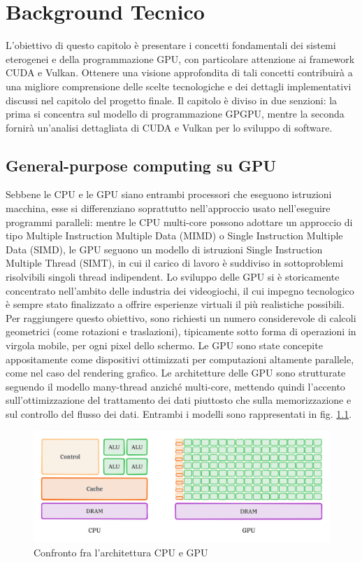 \chapter{Background Tecnico}
\label{sec:background}


L'obiettivo di questo capitolo è presentare i concetti fondamentali dei sistemi eterogenei e della programmazione GPU, con particolare attenzione ai framework CUDA e Vulkan. Ottenere una visione approfondita di tali concetti contribuirà a una migliore comprensione delle scelte tecnologiche e dei dettagli implementativi discussi nel capitolo del progetto finale. Il capitolo è diviso in due senzioni: la prima si concentra sul modello di programmazione GPGPU, mentre la seconda fornirà un'analisi dettagliata di CUDA e Vulkan per lo sviluppo di software.

\section[General-purpose computing su GPU]{General-purpose computing su GPU}

Sebbene le CPU e le GPU siano entrambi processori che eseguono istruzioni macchina, esse si differenziano soprattutto nell'approccio usato nell'eseguire programmi paralleli: mentre le CPU multi-core possono adottare un approccio di tipo Multiple Instruction Multiple Data (MIMD) o Single Instruction Multiple Data (SIMD), le GPU seguono un modello di istruzioni Single Instruction Multiple Thread (SIMT), in cui il carico di lavoro è suddiviso in sottoproblemi risolvibili singoli thread indipendent. Lo sviluppo delle GPU si è storicamente concentrato nell'ambito delle industria dei videogiochi, il cui impegno tecnologico è sempre stato finalizzato a offrire esperienze virtuali il più realistiche possibili. Per raggiungere questo obiettivo, sono richiesti un numero considerevole di calcoli geometrici (come rotazioni e traslazioni), tipicamente sotto forma di operazioni in virgola mobile, per ogni pixel dello schermo. Le GPU sono state concepite appositamente come dispositivi ottimizzati per computazioni altamente parallele, come nel caso del rendering grafico. Le architetture delle GPU sono strutturate seguendo il modello many-thread anziché multi-core, mettendo quindi l'accento sull'ottimizzazione del trattamento dei dati piuttosto che sulla memorizzazione e sul controllo del flusso dei dati.
Entrambi i modelli sono rappresentati in fig. \ref{fig:cpu_vs_gpu}.

\begin{figure}[ht]
    \centering
    \includegraphics[width=.9\linewidth]{images/chapter2/cpu_vs_gpu.png}
    \caption{Confronto fra l'architettura CPU e GPU}
    \label{fig:cpu_vs_gpu}
\end{figure}

